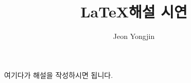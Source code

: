 \documentclass{article}
\author{Jeon Yongjin}
\title{\LaTeX 해설 시연}
\date{}
\begin{document}
\maketitle


여기다가 해설을 작성하시면 됩니다.
\end{document}
